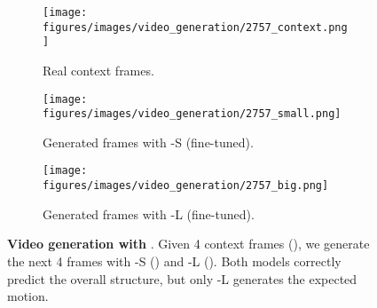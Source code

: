 \begin{figure}[h]
\centering
\begin{subfigure}{\linewidth} 
\texttt{[image: figures/images/video\_generation/2757\_context.png]}
\caption{Real context frames.}
\label{fig:context_frames}
\end{subfigure}
\begin{subfigure}{\linewidth} 
\texttt{[image: figures/images/video\_generation/2757\_small.png]}
\caption{Generated frames with \vm-S (fine-tuned).}
\label{fig:video_generation_vms}
\end{subfigure}
\begin{subfigure}{\linewidth} 
\texttt{[image: figures/images/video\_generation/2757\_big.png]}
\caption{Generated frames with \vm-L (fine-tuned).}
\label{fig:video_generation_vml}
\end{subfigure}
\caption{\textbf{Video generation with \vm}. Given 4 context frames (), we generate the next 4 frames with \vm-S () and \vm-L (). Both models correctly predict the overall structure, but only \vm-L generates the expected motion.}
\label{fig:video_generation}
\end{figure}